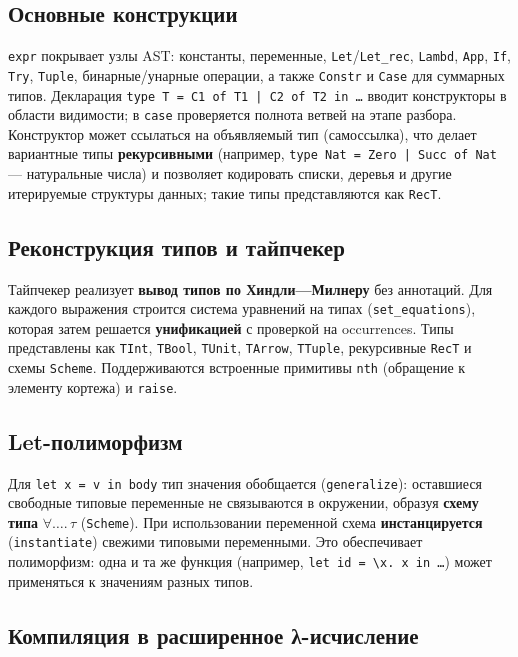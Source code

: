 \documentclass[a4paper]{article}
\begin{document}
\subsection{Основные конструкции}

\texttt{expr} покрывает узлы AST: константы, переменные, \texttt{Let}/\texttt{Let\_rec}, \texttt{Lambd}, \texttt{App}, \texttt{If}, \texttt{Try}, \texttt{Tuple}, бинарные/унарные операции, а также \texttt{Constr} и \texttt{Case} для суммарных типов. Декларация \texttt{type T = C1 of T1 | C2 of T2 in \ldots} вводит конструкторы в области видимости; в \texttt{case} проверяется полнота ветвей на этапе разбора. Конструктор может ссылаться на объявляемый тип (самоссылка), что делает вариантные типы \textbf{рекурсивными} (например, \texttt{type Nat = Zero | Succ of Nat} — натуральные числа) и позволяет кодировать списки, деревья и другие итерируемые структуры данных; такие типы представляются как \texttt{RecT}.

\subsection{Реконструкция типов и тайпчекер}

Тайпчекер реализует \textbf{вывод типов по Хиндли—Милнеру} без аннотаций. Для каждого выражения строится система уравнений на типах (\texttt{set\_equations}), которая затем решается \textbf{унификацией} с проверкой на occurrences. Типы представлены как \texttt{TInt}, \texttt{TBool}, \texttt{TUnit}, \texttt{TArrow}, \texttt{TTuple}, рекурсивные \texttt{RecT} и схемы \texttt{Scheme}. Поддерживаются встроенные примитивы \texttt{nth} (обращение к элементу кортежа) и \texttt{raise}.

\subsection{Let-полиморфизм}

Для \texttt{let x = v in body} тип значения обобщается (\texttt{generalize}): оставшиеся свободные типовые переменные не связываются в окружении, образуя \textbf{схему типа} $\forall\ldots.\,\tau$ (\texttt{Scheme}). При использовании переменной схема \textbf{инстанцируется} (\texttt{instantiate}) свежими типовыми переменными. Это обеспечивает полиморфизм: одна и та же функция (например, \texttt{let id = \textbackslash x. x in \ldots}) может применяться к значениям разных типов.

\subsection{Компиляция в расширенное λ-исчисление}
\end{document}
